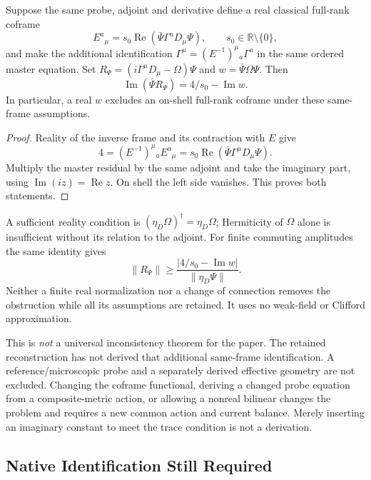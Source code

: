 \begin{proposition}
\label{v480:hc-same-frame-obstruction}
Suppose the same probe, adjoint and derivative define a real
classical full-rank coframe
\[
 E^a{}_\mu=s_0\operatorname{Re}(\bar\Psi\Gamma^aD_\mu\Psi),
 \qquad s_0\in\mathbb R\setminus\{0\},
\]
and make the additional identification
$\Gamma^\mu=(E^{-1})^\mu{}_a\Gamma^a$ in the same ordered
master equation. Set $R_\Psi=(i\Gamma^\mu D_\mu-\Omega)\Psi$
and $w=\bar\Psi\Omega\Psi$. Then
\[
 \operatorname{Im}(\bar\Psi R_\Psi)=4/s_0-\operatorname{Im}w.
\]
In particular, a real $w$ excludes an on-shell full-rank coframe
under these same-frame assumptions.
\end{proposition}
\begin{proof}
Reality of the inverse frame and its contraction with $E$ give
\[
 4=(E^{-1})^\mu{}_aE^a{}_\mu
  =s_0\operatorname{Re}(\bar\Psi\Gamma^\mu D_\mu\Psi).
\]
Multiply the master residual by the same adjoint and take the imaginary
part, using $\operatorname{Im}(iz)=\operatorname{Re}z$.
On shell the left side vanishes. This proves both statements.
\end{proof}

A sufficient reality condition is
$(\eta_D\Omega)^\dagger=\eta_D\Omega$; Hermiticity of $\Omega$
alone is insufficient without its relation to the adjoint. For finite
commuting amplitudes the same identity gives
\[
 \|R_\Psi\|\geq
 \frac{|4/s_0-\operatorname{Im}w|}{\|\eta_D\Psi\|}.
\]
Neither a finite real normalization nor a change of connection removes
the obstruction while all its assumptions are retained. It uses no
weak-field or Clifford approximation.

This is \emph{not} a universal inconsistency theorem for the paper.
The retained reconstruction has not derived that additional same-frame
identification. A reference/microscopic probe and a separately derived
effective geometry are not excluded. Changing the coframe functional,
deriving a changed probe equation from a composite-metric action, or
allowing a nonreal bilinear changes the problem and requires a new
common action and current balance. Merely inserting an imaginary
constant to meet the trace condition is not a derivation.

\subsection{Native Identification Still Required}
\label{v480:hc-geometry-obligations}

